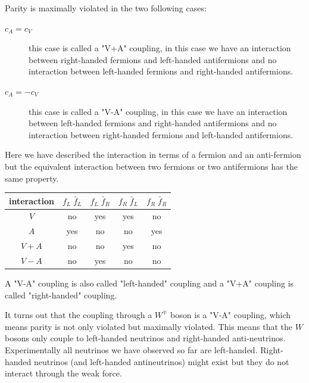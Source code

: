 \documentclass[12pt]{article}
\begin{document}
Parity is maximally violated in the two following cases:
\begin{description}
\item[$c_A=c_V$] this case is called a "V+A" coupling, in this case we have an interaction between right-handed fermions and left-handed antifermions and no interaction between left-handed fermions and right-handed antifermions.  
\item[$c_A=-c_V$] this case is called a "V-A" coupling, in this case we have an interaction between left-handed fermions and right-handed antifermions and no interaction between right-handed fermions and left-handed antifermions.  
\end{description}
Here we have described the interaction in terms of a fermion and an anti-fermion but the equivalent interaction between two fermions or two antifermions has the same property. 
\begin{center}
\begin{tabular}{|c|c|c|c|c|}
\hline 
interaction & $f_L\; \bar f_L$ & $f_L\; \bar f_R$ &$f_R\; \bar f_L$ & $f_R\; \bar f_R$ \\ \hline
$V$  & no  & yes & yes & no \\
$A$  & yes  & no & no & yes \\
$V+A$  & no  & no & yes & no \\
$V-A$  & no  & yes & no & no \\\hline
\end{tabular}
\end{center}

A "V-A" coupling is also called "left-handed" coupling and a "V+A" coupling is called "right-handed" coupling.

It turns out that the coupling through a $W^\mp$ boson is a "V-A" coupling, which means parity is not only violated but maximally violated. This means that the $W$ bosons only couple to left-handed neutrinos and right-handed anti-neutrinos. Experimentally all neutrinos we have observed so far are left-handed. Right-handed neutrinos (and left-handed antineutrinos) might exist but they do not interact through the weak force.
\end{document}
